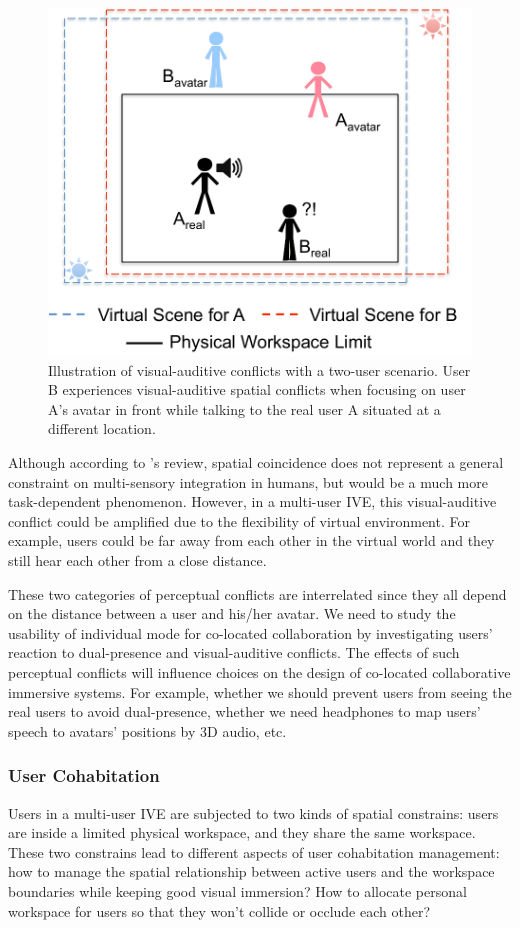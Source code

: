 \begin{figure}[htb]
  \centering
  \includegraphics[width=.7\textwidth]{figures/ch2/pc_visualauditive}
  \caption{\label{fig:2_pc_visualauditive}Illustration of visual-auditive conflicts with a two-user scenario. User B experiences visual-auditive spatial conflicts when focusing on user A's avatar in front while talking to the real user A situated at a different location.}
\end{figure}

Although according to \citet{Spence2013Just}'s review, spatial coincidence does not represent a general constraint on multi-sensory integration in humans, but would be a much more task-dependent phenomenon. However, in a multi-user IVE, this visual-auditive conflict could be amplified due to the flexibility of virtual environment. For example, users could be far away from each other in the virtual world and they still hear each other from a close distance.

These two categories of perceptual conflicts are interrelated since they all depend on the distance between a user and his/her avatar. We need to study the usability of individual mode for co-located collaboration by investigating users' reaction to dual-presence and visual-auditive conflicts. The effects of such perceptual conflicts will influence choices on the design of co-located collaborative immersive systems. For example, whether we should prevent users from seeing the real users to avoid dual-presence, whether we need headphones to map users' speech to avatars' positions by 3D audio, etc.


\subsubsection{User Cohabitation}
Users in a multi-user IVE are subjected to two kinds of spatial constrains: users are inside a limited physical workspace, and they share the same workspace. These two constrains lead to different aspects of user cohabitation management: how to manage the spatial relationship between active users and the workspace boundaries while keeping good visual immersion? How to allocate personal workspace for users so that they won't collide or occlude each other?

